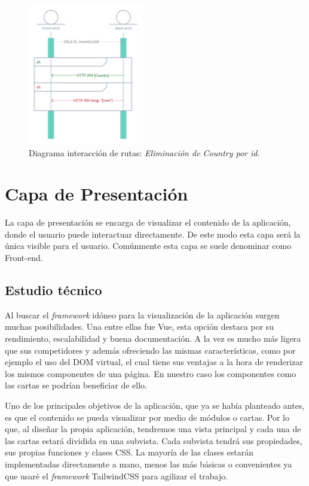 \begin{figure}[H]
    \centering
    \myfloatalign
    \includegraphics[width=0.45\textwidth]{gfx/diagrama-itr8.png}
    \caption[Diagrama interacción de rutas (8)]{Diagrama interacción de rutas: \textit{Eliminación de Country por id}.}\label{gfx:diagrama-itr8}
\end{figure}

\section{Capa de Presentación}
La capa de presentación se encarga de visualizar el contenido de la aplicación, donde el usuario puede interactuar directamente. De este modo esta capa será la única visible para el usuario. Comúnmente esta capa se suele denominar como Front-end.

\subsection{Estudio técnico}
Al buscar el \textit{framework} idóneo para la visualización de la aplicación surgen muchas posibilidades. Una entre ellas fue Vue, esta opción destaca por su rendimiento, escalabilidad y buena documentación. A la vez es mucho más ligera que sus competidores y además ofreciendo las mismas características, como por ejemplo el uso del \ac{DOM} virtual, el cual tiene sus ventajas a la hora de renderizar los mismos componentes de una página. En nuestro caso los componentes como las cartas se podrían beneficiar de ello. \cite{VueComparison}

\vspace{0.3cm}

Uno de los principales objetivos de la aplicación, que ya se había planteado antes, es que el contenido se pueda visualizar por medio de módulos o cartas. Por lo que, al diseñar la propia aplicación, tendremos una vista principal y cada una de las cartas estará dividida en una subvista. Cada subvista tendrá sus propiedades, sus propias funciones y clases CSS. La mayoría de las clases estarán implementadas directamente a mano, menos las más básicas o convenientes ya que usaré el \textit{framework} TailwindCSS para agilizar el trabajo.

